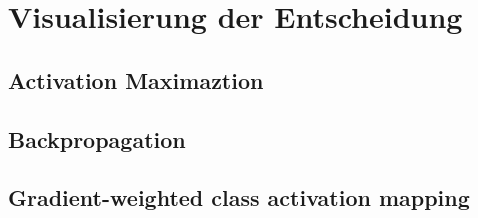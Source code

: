 \section{Visualisierung der Entscheidung} \label{sec:visAlgos}

\subsection{Activation Maximaztion} \label{sec:actMax}




\subsection{Backpropagation} \label{sec:backprop}



\subsection{Gradient-weighted class activation mapping}


